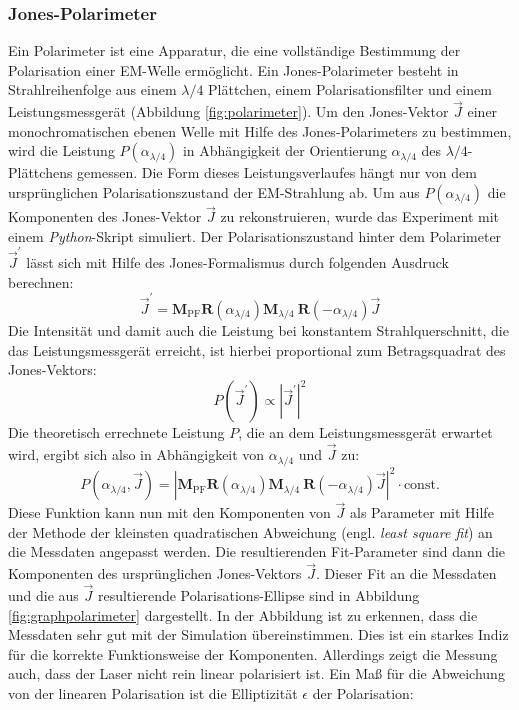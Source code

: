 \documentclass[a4paper, titlepage,  ngerman, fullpage]{book}
\begin{document}
	\subsubsection{Jones-Polarimeter}
	Ein Polarimeter ist eine Apparatur, die eine vollständige Bestimmung der Polarisation einer EM-Welle ermöglicht. Ein Jones-Polarimeter besteht in Strahlreihenfolge aus einem $\lambda / 4$ Plättchen, einem Polarisationsfilter und einem Leistungsmessgerät (Abbildung \ref{fig:polarimeter}). Um den Jones-Vektor $\vec{J}$ einer monochromatischen ebenen Welle mit Hilfe des Jones-Polarimeters zu bestimmen, wird die Leistung $P(\alpha_{\lambda/4})$ in Abhängigkeit der Orientierung $\alpha_{\lambda/4}$ des $\lambda / 4$-Plättchens gemessen. Die Form dieses Leistungsverlaufes hängt nur von dem ursprünglichen Polarisationszustand der EM-Strahlung ab. Um aus $P(\alpha_{\lambda/4})$ die Komponenten des Jones-Vektor $\vec{J}$ zu rekonstruieren, wurde das Experiment mit einem \textit{Python}-Skript simuliert. Der Polarisationszustand hinter dem Polarimeter $\vec{J}^\prime$ lässt sich mit Hilfe des Jones-Formalismus durch folgenden Ausdruck berechnen:
	\begin{equation}
		\vec{J}^\prime = \boldsymbol{M}_\mathrm{PF} \boldsymbol{R}(\alpha_{\lambda/4})\boldsymbol{M}_{\lambda / 4}\ \boldsymbol{R}(-\alpha_{\lambda/4})\vec{J}
	\end{equation}
	Die Intensität und damit auch die Leistung bei konstantem Strahlquerschnitt, die das Leistungsmessgerät erreicht, ist hierbei proportional zum Betragsquadrat des Jones-Vektors:
	\begin{equation}
		P(\vec{J}^\prime) \propto \left|\vec{J}^\prime\right|^2
	\end{equation}
	Die theoretisch errechnete Leistung $P$, die an dem Leistungsmessgerät erwartet wird, ergibt sich also in Abhängigkeit von $\alpha_{\lambda/4}$ und $\vec{J}$ zu:
	\begin{equation}
		P(\alpha_{\lambda/4}, \vec{J}) = \left|\boldsymbol{M}_\mathrm{PF} \boldsymbol{R}(\alpha_{\lambda/4})\boldsymbol{M}_{\lambda / 4}\ \boldsymbol{R}(-\alpha_{\lambda/4})\vec{J}\right|^2 \cdot \mathrm{const.}
		\label{eq:simulation_polarimeter}
	\end{equation}
	Diese Funktion kann nun mit den Komponenten von $\vec{J}$ als Parameter mit Hilfe der Methode der kleinsten quadratischen Abweichung (engl. \textit{least square fit}) an die Messdaten angepasst werden. Die resultierenden Fit-Parameter sind dann die Komponenten des ursprünglichen Jones-Vektors $\vec{J}$. Dieser Fit an die Messdaten und die aus $\vec{J}$ resultierende Polarisations-Ellipse sind in Abbildung \ref{fig:graphpolarimeter} dargestellt. In der Abbildung ist zu erkennen, dass die Messdaten sehr gut mit der Simulation übereinstimmen. Dies ist ein starkes Indiz für die korrekte Funktionsweise der Komponenten. Allerdings zeigt die Messung auch, dass der Laser nicht rein linear polarisiert ist. Ein Maß für die Abweichung von der linearen Polarisation ist die Elliptizität $\epsilon$ der Polarisation:
\end{document}

